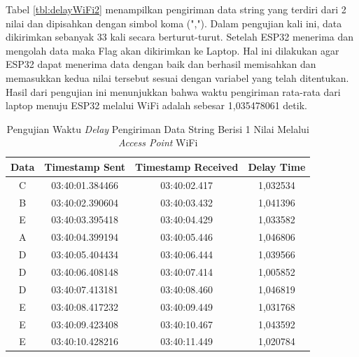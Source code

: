 Tabel \ref{tbl:delayWiFi2} menampilkan pengiriman data string yang terdiri dari 2 nilai dan dipisahkan dengan simbol koma (","). Dalam pengujian kali ini, data dikirimkan sebanyak 33 kali secara berturut-turut. Setelah ESP32 menerima dan mengolah data maka Flag akan dikirimkan ke Laptop. Hal ini dilakukan agar ESP32 dapat menerima data dengan baik dan berhasil memisahkan dan memasukkan kedua nilai tersebut sesuai dengan variabel yang telah ditentukan. Hasil dari pengujian ini menunjukkan bahwa waktu pengiriman rata-rata dari laptop menuju ESP32 melalui WiFi adalah sebesar 1,035478061 detik.

\begin{longtable}{|ccc|c|}
  \caption{Pengujian Waktu \emph{Delay} Pengiriman Data String Berisi 1 Nilai Melalui \emph{Access Point} WiFi}
  \label{tbl:delayWiFi1}\\
  \hline
  \multicolumn{1}{|c|}{Data} & \multicolumn{1}{c|}{Timestamp Sent}  & Timestamp Received & Delay Time \\ \hline
  \endfirsthead
  \endhead
  \multicolumn{1}{|c|}{C}    & \multicolumn{1}{c|}{03:40:01.384466} & 03:40:02.417       & 1,032534   \\ \hline
  \multicolumn{1}{|c|}{B}    & \multicolumn{1}{c|}{03:40:02.390604} & 03:40:03.432       & 1,041396   \\ \hline
  \multicolumn{1}{|c|}{E}    & \multicolumn{1}{c|}{03:40:03.395418} & 03:40:04.429       & 1,033582   \\ \hline
  \multicolumn{1}{|c|}{A}    & \multicolumn{1}{c|}{03:40:04.399194} & 03:40:05.446       & 1,046806   \\ \hline
  \multicolumn{1}{|c|}{D}    & \multicolumn{1}{c|}{03:40:05.404434} & 03:40:06.444       & 1,039566   \\ \hline
  \multicolumn{1}{|c|}{D}    & \multicolumn{1}{c|}{03:40:06.408148} & 03:40:07.414       & 1,005852   \\ \hline
  \multicolumn{1}{|c|}{D}    & \multicolumn{1}{c|}{03:40:07.413181} & 03:40:08.460       & 1,046819   \\ \hline
  \multicolumn{1}{|c|}{E}    & \multicolumn{1}{c|}{03:40:08.417232} & 03:40:09.449       & 1,031768   \\ \hline
  \multicolumn{1}{|c|}{E}    & \multicolumn{1}{c|}{03:40:09.423408} & 03:40:10.467       & 1,043592   \\ \hline
  \multicolumn{1}{|c|}{E}    & \multicolumn{1}{c|}{03:40:10.428216} & 03:40:11.449       & 1,020784   \\ \hline

\end{longtable}
